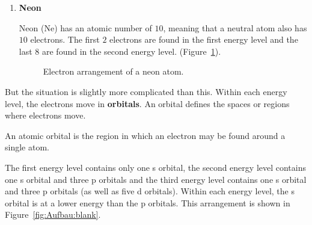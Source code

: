 \begin{enumerate}[noitemsep, label=\textbf{\arabic*}. ]
\item{\textbf{Neon} \\
\begin{minipage}{.4\textwidth}
Neon ($\text{Ne}$) has an atomic number of $10$, meaning that a neutral atom also has $10$ electrons. The first $2$ electrons are found in the first energy level and the last $8$ are found in the second energy level. (Figure~\ref{fig:atom:neon}).
\end{minipage}
\begin{minipage}{.6\textwidth}
\begin{figure}[H]
\begin{center}
\caption{Electron arrangement of a neon atom.}
\label{fig:atom:neon}
\end{center}
\end{figure}
\end{minipage}
}
\end{enumerate}

But the situation is slightly more complicated than this. Within each energy level, the electrons move in \textbf{orbitals}. An orbital defines the spaces or regions where electrons move.

 {An atomic orbital is the region in which an electron may be found around a single atom.} 

The first energy level contains only one s orbital, the second energy level contains one s orbital and three p orbitals and the third energy level contains one s orbital and three p orbitals (as well as five d orbitals). Within each energy level, the s orbital is at a lower energy than the p orbitals. This arrangement is shown in Figure~\ref{fig:Aufbau:blank}. 

